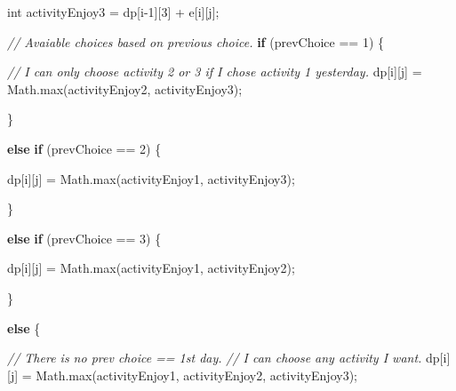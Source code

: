 \documentclass[
]{article}
\newenvironment{Shaded}{}{}
\newcommand{\BuiltInTok}[1]{#1}
\newcommand{\CommentTok}[1]{\textcolor[rgb]{0.38,0.63,0.69}{\textit{#1}}}
\newcommand{\ControlFlowTok}[1]{\textcolor[rgb]{0.00,0.44,0.13}{\textbf{#1}}}
\newcommand{\DataTypeTok}[1]{\textcolor[rgb]{0.56,0.13,0.00}{#1}}
\newcommand{\DecValTok}[1]{\textcolor[rgb]{0.25,0.63,0.44}{#1}}
\newcommand{\FunctionTok}[1]{\textcolor[rgb]{0.02,0.16,0.49}{#1}}
\newcommand{\NormalTok}[1]{#1}
\newcommand{\OperatorTok}[1]{\textcolor[rgb]{0.40,0.40,0.40}{#1}}
\begin{document}
\begin{Shaded}
\begin{Highlighting}[]
            \DataTypeTok{int}\NormalTok{ activityEnjoy3 }\OperatorTok{=}\NormalTok{ dp}\OperatorTok{[}\NormalTok{i}\OperatorTok{{-}}\DecValTok{1}\OperatorTok{][}\DecValTok{3}\OperatorTok{]} \OperatorTok{+}\NormalTok{ e}\OperatorTok{[}\NormalTok{i}\OperatorTok{][}\NormalTok{j}\OperatorTok{];}

            \CommentTok{// Avaiable choices based on previous choice.
}
            \ControlFlowTok{if} \OperatorTok{(}\NormalTok{prevChoice }\OperatorTok{==} \DecValTok{1}\OperatorTok{)} \OperatorTok{\{}

                \CommentTok{// I can only choose activity 2 or 3 if I chose activity 1 yesterday.
}
\NormalTok{                dp}\OperatorTok{[}\NormalTok{i}\OperatorTok{][}\NormalTok{j}\OperatorTok{]} \OperatorTok{=} \BuiltInTok{Math}\OperatorTok{.}\FunctionTok{max}\OperatorTok{(}\NormalTok{activityEnjoy2}\OperatorTok{,}\NormalTok{ activityEnjoy3}\OperatorTok{);}

            \OperatorTok{\}}

            \ControlFlowTok{else} \ControlFlowTok{if} \OperatorTok{(}\NormalTok{prevChoice }\OperatorTok{==} \DecValTok{2}\OperatorTok{)} \OperatorTok{\{}

\NormalTok{                dp}\OperatorTok{[}\NormalTok{i}\OperatorTok{][}\NormalTok{j}\OperatorTok{]} \OperatorTok{=} \BuiltInTok{Math}\OperatorTok{.}\FunctionTok{max}\OperatorTok{(}\NormalTok{activityEnjoy1}\OperatorTok{,}\NormalTok{ activityEnjoy3}\OperatorTok{);}

            \OperatorTok{\}}

            \ControlFlowTok{else} \ControlFlowTok{if} \OperatorTok{(}\NormalTok{prevChoice }\OperatorTok{==} \DecValTok{3}\OperatorTok{)} \OperatorTok{\{}

\NormalTok{                dp}\OperatorTok{[}\NormalTok{i}\OperatorTok{][}\NormalTok{j}\OperatorTok{]} \OperatorTok{=} \BuiltInTok{Math}\OperatorTok{.}\FunctionTok{max}\OperatorTok{(}\NormalTok{activityEnjoy1}\OperatorTok{,}\NormalTok{ activityEnjoy2}\OperatorTok{);}

            \OperatorTok{\}}

            \ControlFlowTok{else} \OperatorTok{\{}

                \CommentTok{// There is no prev choice == 1st day.
}
                \CommentTok{// I can choose any activity I want.
}
\NormalTok{                dp}\OperatorTok{[}\NormalTok{i}\OperatorTok{][}\NormalTok{j}\OperatorTok{]} \OperatorTok{=} \BuiltInTok{Math}\OperatorTok{.}\FunctionTok{max}\OperatorTok{(}\NormalTok{activityEnjoy1}\OperatorTok{,}\NormalTok{ activityEnjoy2}\OperatorTok{,}\NormalTok{ activityEnjoy3}\OperatorTok{);}


\end{Highlighting}
\end{Shaded}
\end{document}
